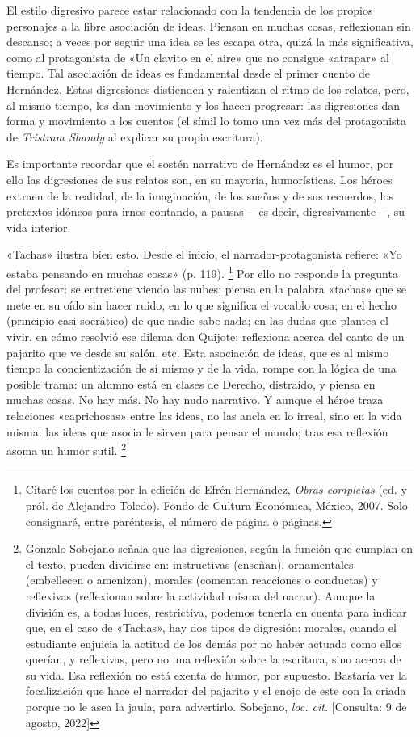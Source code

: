 \documentclass[14pt,twoside,final]{extbook} %
\let\oldfootnote\footnote
\renewcommand\footnote[1]{%
\oldfootnote{\hspace{1mm}#1}}
\begin{document}
El estilo digresivo parece estar relacionado con la tendencia de los propios personajes a la libre asociación de ideas. Piensan en muchas cosas, reflexionan sin descanso; a veces por seguir una idea se les escapa otra, quizá la más significativa, como al protagonista de «Un clavito en el aire» que no consigue «atrapar» al tiempo. Tal asociación de ideas es fundamental desde el primer cuento de Hernández. Estas digresiones distienden y ralentizan el ritmo de los relatos, pero, al mismo tiempo, les dan movimiento y los hacen progresar: las digresiones dan forma y movimiento a los cuentos (el símil lo tomo una vez más del protagonista de \emph{Tristram Shandy} al explicar su propia escritura).

Es importante recordar que el sostén narrativo de Hernández es el humor, por ello las digresiones de sus relatos son, en su mayoría, humorísticas. Los héroes extraen de la realidad, de la imaginación, de los sueños y de sus recuerdos, los pretextos idóneos para irnos contando, a pausas ---es decir, digresivamente---, su vida interior.

«Tachas» ilustra bien esto. Desde el inicio, el narrador-protagonista refiere: «Yo estaba pensando en muchas cosas» (p. 119).\footnote{Citaré los cuentos por la edición de Efrén Hernández, \emph{Obras completas} (ed. y pról. de Alejandro Toledo). Fondo de Cultura Económica,  México, 2007. Solo consignaré, entre paréntesis, el número de página o páginas.} Por ello no responde la pregunta del profesor: se entretiene viendo las nubes; piensa en la palabra «tachas» que se mete en su oído sin hacer ruido, en lo que significa el vocablo cosa; en el hecho (principio casi socrático) de que nadie sabe nada; en las dudas que plantea el vivir, en cómo resolvió ese dilema don Quijote; reflexiona acerca del canto de un pajarito que ve desde su salón, etc. Esta asociación de ideas, que es al mismo tiempo la concientización de sí mismo y de la vida, rompe con la lógica de una posible trama: un alumno está en clases de Derecho, distraído, y piensa en muchas cosas. No hay más. No hay nudo narrativo. Y aunque el héroe traza relaciones «caprichosas» entre las ideas, no las ancla en lo irreal, sino en la vida misma: las ideas que asocia le sirven para pensar el mundo; tras esa reflexión asoma un humor sutil.\footnote{Gonzalo Sobejano señala que las digresiones, según la función que cumplan en el texto, pueden dividirse en: instructivas (enseñan), ornamentales (embellecen o amenizan), morales (comentan reacciones o conductas) y reflexivas (reflexionan sobre la actividad misma del narrar). Aunque la división es, a todas luces, restrictiva, podemos tenerla en cuenta para indicar que, en el caso de «Tachas», hay dos tipos de digresión: morales, cuando el estudiante enjuicia la actitud de los demás por no haber actuado como ellos querían, y reflexivas, pero no una reflexión sobre la escritura, sino acerca de su vida. Esa reflexión no está exenta de humor, por supuesto. Bastaría ver la focalización que hace el narrador del pajarito y el enojo de este con la criada porque no le asea la jaula, para advertirlo. Sobejano, \emph{loc. cit.} [Consulta: 9 de agosto, 2022]}
\end{document}
